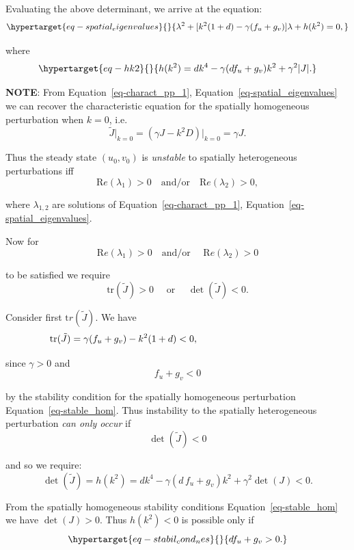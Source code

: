 \documentclass[
  letterpaper,
  DIV=11,
  numbers=noendperiod]{scrreprt}
\theoremstyle{plain}
\theoremstyle{definition}
\theoremstyle{plain}
\theoremstyle{remark}
\begin{document}
Evaluating the above determinant, we arrive at the equation:
\begin{equation}\protect\hypertarget{eq-spatial_eigenvalues}{}{
\lambda^2 + [ k^2 (1 + d) - \gamma (f_u + g_v) ] \lambda + h(k^2) = 0,
}\label{eq-spatial_eigenvalues}\end{equation}

where \begin{equation}\protect\hypertarget{eq-hk2}{}{
h(k^2) = dk^4 - \gamma (df_u + g_v) k^2 + \gamma^2 | J | .
}\label{eq-hk2}\end{equation}

\textbf{NOTE}: From Equation~\ref{eq-charact_pp_1},
Equation~\ref{eq-spatial_eigenvalues} we can recover the characteristic
equation for the spatially homogeneous perturbation when \(k=0\),
i.e.~\[
\tilde J \Big|_{k=0} = ( \gamma J - k^2 D )\Big|_{k=0} = \gamma J.
\]

Thus the steady state \((u_0, v_0)\) is \emph{unstable} to spatially
heterogeneous perturbations iff \[
{\mathrm Re}(\lambda_1) > 0 \quad \textrm{and/or} \quad {\mathrm Re}(\lambda_2) >0,
\]

where \(\lambda_{1,2}\) are solutions of Equation~\ref{eq-charact_pp_1},
Equation~\ref{eq-spatial_eigenvalues}.

Now for \[
{\mathrm Re}(\lambda_1) > 0 \quad \textrm{and/or } \quad {\mathrm Re}(\lambda_2) >0
\]

to be satisfied we require \[
\textrm{tr}(\tilde J) > 0 \quad \textrm{ or } \quad \det(\tilde J) <0.
\]

Consider first \({\mathrm tr} (\tilde{J})\). We have \[
\textrm{tr}(\tilde J) = \gamma ( f_u+ g_v) - k^2(1+d) < 0, \hspace{4 cm}  
\]

since \(\gamma > 0\) and \[ 
f_u+ g_v < 0
\]

by the stability condition for the spatially homogeneous perturbation
Equation~\ref{eq-stable_hom}. Thus instability to the spatially
heterogeneous perturbation \emph{can only occur} if \[
\det(\tilde J) < 0
\]

and so we require: \[
\det(\tilde J) = h(k^2) = dk^4  - \gamma ( d\,  f_u + g_v) k^2 + \gamma^2 \det(J) < 0. 
\]

From the spatially homogeneous stability conditions
Equation~\ref{eq-stable_hom} we have \(\det(J) >0\). Thus \(h(k^2)<0\)
is possible only if
\begin{equation}\protect\hypertarget{eq-stabil_cond_nes}{}{
d f_u + g_v >0.
}\label{eq-stabil_cond_nes}\end{equation}
\end{document}
